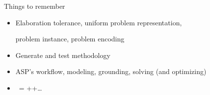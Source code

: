 \begin{frame}{Things to remember}
  \bigskip
  \begin{itemize}
  \item Elaboration tolerance, uniform problem representation,

    problem instance, problem encoding
    \smallskip
  \item Generate and test methodology
    \smallskip
  \item ASP's workflow, modeling, grounding, solving
    (and optimizing)
  \item \clingo\ = \gringo+\clasp\pause+\dots
  \end{itemize}
\end{frame}
%
